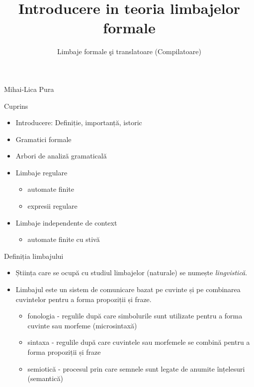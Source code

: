 \documentclass[pdf]{beamer}
\title{Introducere in teoria limbajelor formale}
\subtitle{Limbaje formale şi translatoare (Compilatoare)}
\begin{document}
\begin{frame}
	\titlepage
	
\begin{flushright}
Mihai-Lica Pura\\
\end{flushright}

\end{frame}



\begin{frame}{Cuprins}
\begin{itemize}
\item
Introducere: Definiție, importanță, istoric
\item
Gramatici formale
\item
Arbori de analiză gramaticală
\item
Limbaje regulare
\begin{itemize}
\item
automate finite
\item
expresii regulare
\end{itemize}
\item
Limbaje independente de context
\begin{itemize}
\item
automate finite cu stivă
\end{itemize}
\end{itemize}
\end{frame}



\begin{frame}{Definiția limbajului}
\begin{itemize}
\item
Știința care se ocupă cu studiul limbajelor (naturale) se numește \textit{lingvistică}.
\item
Limbajul este un sistem de comunicare bazat pe cuvinte și pe combinarea cuvintelor pentru a forma propoziții și fraze.
\begin{itemize}
\item
fonologia - regulile după care simbolurile sunt utilizate pentru a forma cuvinte sau morfeme (microsintaxă)
\item
sintaxa - regulile după care cuvintele sau morfemele se combină pentru a forma propoziții și fraze
\item
semiotică - procesul prin care semnele sunt legate de anumite înțelesuri (semantică)
\end{itemize}
\end{itemize}
\end{frame}
\end{document}
